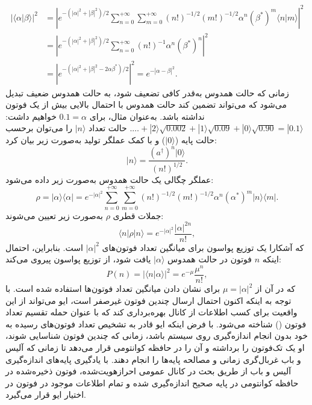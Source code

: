 \begin{equation}
	\begin{aligned}
		|\langle\alpha | \beta\rangle|^2 &= \left| e^{-(|\alpha|^2+|\beta|^2)/2} \sum_{n=0}^{+\infty} \sum_{m=0}^{+\infty} (n!)^{-1/2}(m!)^{-1/2} \alpha^n (\beta^*)^m \langle n|m\rangle \right|^2 \\
		&= \left| e^{-(|\alpha|^2+|\beta|^2)/2} \sum_{n=0}^{+\infty} (n!)^{-1} \alpha^n (\beta^*)^n \right|^2 \\
		&= \left| e^{-(|\alpha|^2+|\beta|^2-2\alpha\beta^*)/2} \right|^2 = e^{-|\alpha-\beta|^2}.
	\end{aligned}
	\label{eq:7-11}
\end{equation}
زمانی که حالت همدوس به‌قدر کافی تضعیف شود، به حالت همدوس ضعیف تبدیل می‌شود که می‌تواند تضمین کند حالت همدوس با احتمال بالایی بیش از یک فوتون نداشته باشد. به‌عنوان مثال، برای $0.1 = \alpha$ خواهیم داشت: $\dots + |2\rangle \sqrt{0.002} + |1\rangle \sqrt{0.09} + |0\rangle \sqrt{0.90} = |0.1\rangle$. حالت تعداد $|n\rangle$ را می‌توان برحسب حالت پایه ($|0\rangle$) و با کمک عملگر تولید به‌صورت زیر بیان کرد:
\begin{equation}
	|n\rangle = \frac{(a^\dagger)^n |0\rangle}{(n!)^{1/2}}.
	\label{eq:7-12}
\end{equation}
عملگر چگالی یک حالت همدوس به‌صورت زیر داده می‌شود:
\begin{equation}
	\rho = |\alpha\rangle\langle\alpha| = e^{-|\alpha|^2} \sum_{n=0}^{+\infty} \sum_{m=0}^{+\infty} (n!)^{-1/2}(m!)^{-1/2} \alpha^n (\alpha^*)^m |n\rangle\langle m|.
	\label{eq:7-13}
\end{equation}
جملات قطری $\rho$ به‌صورت زیر تعیین می‌شوند:
\begin{equation}
	\langle n | \rho | n \rangle = e^{-|\alpha|^2} \frac{|\alpha|^{2n}}{n!},
	\label{eq:7-14}
\end{equation}
که آشکارا یک توزیع پواسون برای میانگین تعداد فوتون‌های $|\alpha|^2$ است. بنابراین، احتمال اینکه $n$ فوتون در حالت همدوس $|\alpha\rangle$ یافت شود، از توزیع پواسون پیروی می‌کند:
\begin{equation}
	P(n) = |\langle n | \alpha \rangle|^2 = e^{-\mu} \frac{\mu^n}{n!},
	\label{eq:7-15}
\end{equation}
که در آن از $\mu = |\alpha|^2$ برای نشان دادن میانگین تعداد فوتون‌ها استفاده شده است. با توجه به اینکه اکنون احتمال ارسال چندین فوتون غیرصفر است، ایو می‌تواند از این واقعیت برای کسب اطلاعات از کانال بهره‌برداری کند که با عنوان حمله تقسیم تعداد فوتون () شناخته می‌شود. با فرض اینکه ایو قادر به تشخیص تعداد فوتون‌های رسیده به خود بدون انجام اندازه‌گیری روی سیستم باشد، زمانی که چندین فوتون شناسایی شوند، او یک تک‌فوتون را برداشته و آن را در حافظه کوانتومی قرار می‌دهد تا زمانی که آلیس و باب غربال‌گری زمانی و مصالحه پایه‌ها را انجام دهند. با یادگیری پایه‌های اندازه‌گیری آلیس و باب از طریق بحث در کانال عمومی احرازهویت‌شده، فوتون ذخیره‌شده در حافظه کوانتومی در پایه صحیح اندازه‌گیری شده و تمام اطلاعات موجود در فوتون در اختیار ایو قرار می‌گیرد.

